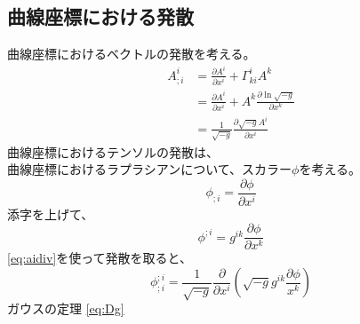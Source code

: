 \documentclass{jsarticle}
\newcommand{\pder}[2][]{\frac{\partial#1}{\partial#2}}
\begin{document}
\subsection{曲線座標における発散}
曲線座標におけるベクトルの発散を考える。
\begin{align}
    A^{i}_{;i} 
    &= 
    \pder[A^{i}]{x^i} + \Gamma^i_{ki}A^k\\
    &=
    \pder[A^{i}]{x^i} + A^k\pder[\ln{\sqrt{-g}}]{x^k}\\
    &=
    \frac{1}{\sqrt{-g}}\frac{\partial \sqrt{-g}A^{i}}{\partial{x^{i}}}
    \label{eq:aidiv}
\end{align}
曲線座標におけるテンソルの発散は、\\
曲線座標におけるラプラシアンについて、スカラー$\phi$を考える。
\begin{equation}
\phi_{;i} = \pder[\phi]{x^i}
\end{equation}
添字を上げて、
\begin{equation}
    \phi^{;i} = g^{ik}\pder[\phi]{x^k}
\end{equation}
\eqref{eq:aidiv}を使って発散を取ると、
\begin{equation}
    \phi^{;i}_{;i} = 
    \frac{1}{\sqrt{-g}}
    \frac{\partial}{\partial{x^{i}}}
    \left(
        \sqrt{-g}g^{ik} \frac{\partial\phi}{x^{k}}
    \right)
\end{equation}
ガウスの定理
\ref{eq:Dg}
\end{document}
